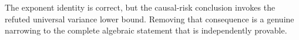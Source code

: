 The exponent identity is correct, but the causal-risk conclusion invokes the refuted universal variance lower bound.  Removing that consequence is a genuine narrowing to the complete algebraic statement that is independently provable.